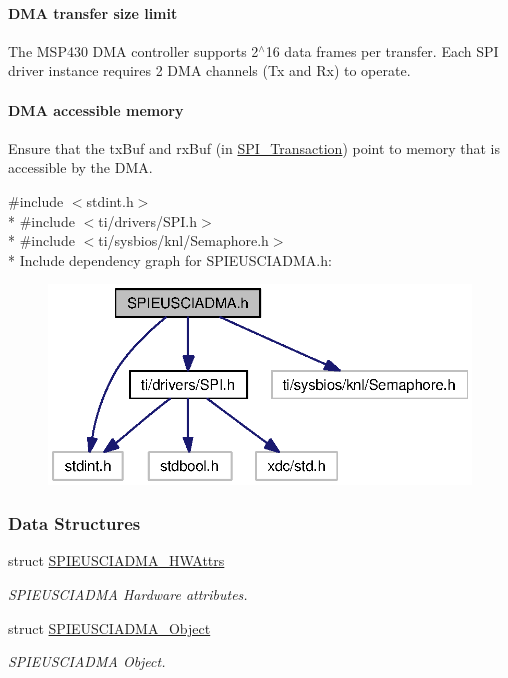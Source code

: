 \paragraph*{D\-M\-A transfer size limit}

The M\-S\-P430 D\-M\-A controller supports 2$^\wedge$16 data frames per transfer. Each S\-P\-I driver instance requires 2 D\-M\-A channels (Tx and Rx) to operate.

\paragraph*{D\-M\-A accessible memory}

Ensure that the tx\-Buf and rx\-Buf (in \hyperlink{struct_s_p_i___transaction}{S\-P\-I\-\_\-\-Transaction}) point to memory that is accessible by the D\-M\-A. 

{\ttfamily \#include $<$stdint.\-h$>$}\\*
{\ttfamily \#include $<$ti/drivers/\-S\-P\-I.\-h$>$}\\*
{\ttfamily \#include $<$ti/sysbios/knl/\-Semaphore.\-h$>$}\\*
Include dependency graph for S\-P\-I\-E\-U\-S\-C\-I\-A\-D\-M\-A.\-h\-:
\nopagebreak
\begin{figure}[H]
\begin{center}
\leavevmode
\includegraphics[width=322pt]{_s_p_i_e_u_s_c_i_a_d_m_a_8h__incl}
\end{center}
\end{figure}
\subsubsection*{Data Structures}
\begin{DoxyCompactItemize}
\item 
struct \hyperlink{struct_s_p_i_e_u_s_c_i_a_d_m_a___h_w_attrs}{S\-P\-I\-E\-U\-S\-C\-I\-A\-D\-M\-A\-\_\-\-H\-W\-Attrs}
\begin{DoxyCompactList}\small\item\em S\-P\-I\-E\-U\-S\-C\-I\-A\-D\-M\-A Hardware attributes. \end{DoxyCompactList}\item 
struct \hyperlink{struct_s_p_i_e_u_s_c_i_a_d_m_a___object}{S\-P\-I\-E\-U\-S\-C\-I\-A\-D\-M\-A\-\_\-\-Object}
\begin{DoxyCompactList}\small\item\em S\-P\-I\-E\-U\-S\-C\-I\-A\-D\-M\-A Object. \end{DoxyCompactList}\end{DoxyCompactItemize}
